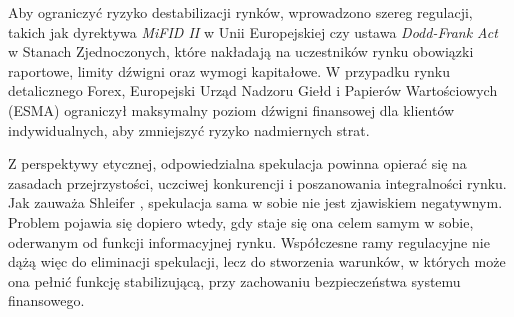 Aby ograniczyć ryzyko destabilizacji rynków, wprowadzono szereg regulacji, takich jak dyrektywa \emph{MiFID II} w Unii Europejskiej czy ustawa \emph{Dodd-Frank Act} w Stanach Zjednoczonych, 
które nakładają na uczestników rynku obowiązki raportowe, limity dźwigni oraz wymogi kapitałowe. 
W przypadku rynku detalicznego Forex, Europejski Urząd Nadzoru Giełd i Papierów Wartościowych (ESMA) ograniczył maksymalny poziom dźwigni finansowej dla klientów indywidualnych, 
aby zmniejszyć ryzyko nadmiernych strat.

Z perspektywy etycznej, odpowiedzialna spekulacja powinna opierać się na zasadach przejrzystości, uczciwej konkurencji i poszanowania integralności rynku. 
Jak zauważa Shleifer \parencite{shleifer2000}, spekulacja sama w sobie nie jest zjawiskiem negatywnym. Problem pojawia się dopiero wtedy, gdy staje się ona celem samym w sobie, oderwanym od funkcji informacyjnej rynku.
Współczesne ramy regulacyjne nie dążą więc do eliminacji spekulacji, lecz do stworzenia warunków, w których może ona pełnić funkcję stabilizującą, przy zachowaniu bezpieczeństwa systemu finansowego.

